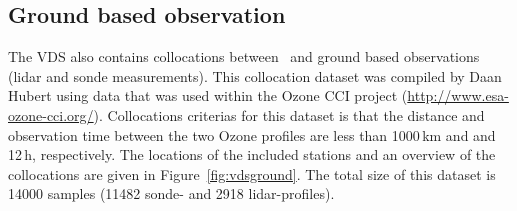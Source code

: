 \subsection{Ground based observation}

The VDS also contains collocations between \smr\ and ground based observations
(lidar and sonde measurements). This collocation dataset was compiled
by Daan Hubert using data that was used within the Ozone CCI project
(\url{http://www.esa-ozone-cci.org/}).
Collocations criterias for this dataset is that
the distance and observation time between the two Ozone profiles are
less than 1000\,km and and 12\,h, respectively.
The locations of the included stations and an overview of the collocations are given
in Figure~\ref{fig:vdsground}.
The total size of this dataset is 14000 samples 
(11482 sonde- and 2918 lidar-profiles).




 


